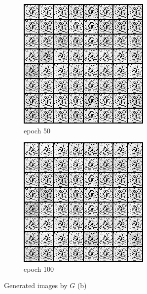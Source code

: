 \documentclass[a4paper]{article}
\theoremstyle{definition}
\newenvironment{soln}{
	\leavevmode\color{blue}\ignorespaces
}{}
\begin{document}
\begin{enumerate} [label=(\alph*)]
\begin{soln}
\begin{figure}[H]
\begin{subfigure}[b]{0.3\textwidth}
				      \includegraphics[width=\textwidth]{img/q1_2/gen_img50.png}
				      \caption{epoch 50}
			      \end{subfigure}
			      \hfill
			      \begin{subfigure}[b]{0.3\textwidth}
				      \centering
				      \includegraphics[width=\textwidth]{img/q1_2/gen_img100.png}
				      \caption{epoch 100}
			      \end{subfigure}
			      \caption*{Generated images by $G$ (b)}
		      \end{figure}
	      \end{soln}


\end{enumerate}
\end{document}

